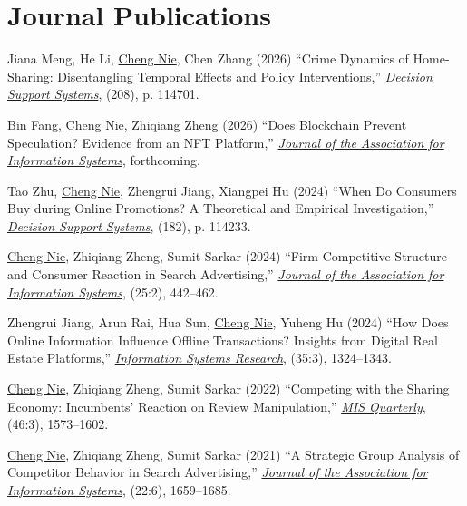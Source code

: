 \documentclass[paper=letter,fontsize=10pt]{scrartcl} %
\newcommand{\NewPart}[2]{\section*{{#1} #2}}
\newcommand{\ReviewEntry}[5]{
		\noindent #1 (#2) ``#3,'' \textit{\ul{#4}}, #5.}
\newcommand{\Nie}{\underline{Cheng Nie}}
\begin{document}
\NewPart{Journal Publications}{}
\begin{etaremune}


\item \ReviewEntry{Jiana Meng, He Li, \Nie, Chen Zhang}{2026}{Crime Dynamics of Home-Sharing: Disentangling Temporal Effects and Policy Interventions}{Decision Support Systems}{(208), p. 114701}{} 

\item \ReviewEntry{Bin Fang, \Nie, Zhiqiang Zheng}{2026}{Does Blockchain Prevent Speculation? Evidence from an NFT Platform}{\protect\newline Journal of the Association for Information Systems}{forthcoming}{}

\item \ReviewEntry{Tao Zhu, \Nie, Zhengrui Jiang, Xiangpei Hu}{2024}{When Do Consumers Buy during Online Promotions? A Theoretical and Empirical Investigation}{\protect\newline Decision Support Systems}{(182), p. 114233}{}

\item \ReviewEntry{\Nie, Zhiqiang Zheng, Sumit Sarkar}{2024}{Firm Competitive Structure and Consumer Reaction in Search Advertising}{\protect\newline Journal of the Association for Information Systems}{(25:2), 442–462}{}

\item \ReviewEntry{Zhengrui Jiang, Arun Rai, Hua Sun, \Nie, Yuheng Hu}{2024}{How Does Online Information Influence Offline Transactions? Insights from Digital Real Estate Platforms}{\protect\newline Information Systems Research}{(35:3), 1324–1343}{}

\item \ReviewEntry{\Nie, Zhiqiang Zheng, Sumit Sarkar}{2022}{Competing with the Sharing Economy: Incumbents' Reaction on Review Manipulation}{\protect\newline MIS Quarterly}{(46:3), 1573–1602}{}

\item \ReviewEntry{\Nie, Zhiqiang Zheng, Sumit Sarkar}{2021}{A Strategic Group Analysis of Competitor Behavior in Search Advertising}{\protect\newline Journal of the Association for Information Systems}{(22:6), 1659–1685}{}

\end{etaremune}
\end{document}
